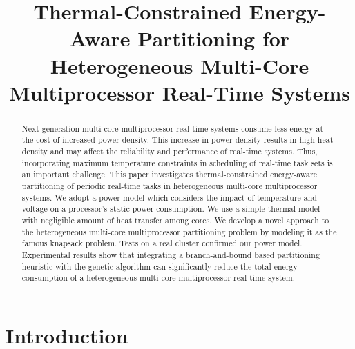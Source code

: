\documentclass[conference]{IEEEtran}
\begin{document}
\title{\LARGE Thermal-Constrained Energy-Aware Partitioning for Heterogeneous Multi-Core Multiprocessor Real-Time Systems}

\author{
 }


\maketitle


\begin{abstract}
Next-generation multi-core multiprocessor real-time systems consume less energy at the cost of increased power-density.
This increase in power-density results in high
heat-density and may affect the reliability and performance of real-time systems. Thus, incorporating maximum temperature
constraints in scheduling of real-time task sets is an important challenge.
This paper investigates thermal-constrained energy-aware %
partitioning of periodic real-time tasks in heterogeneous multi-core
multiprocessor systems. We adopt a power model which considers the impact of temperature and voltage on a processor's static power consumption.
We use a simple thermal model with negligible amount of heat
transfer among cores.
We develop a novel approach to the heterogeneous multi-core multiprocessor partitioning problem by modeling it as the famous knapsack problem.
Tests on a real cluster confirmed our power model.
Experimental results show that integrating a branch-and-bound based partitioning heuristic with the genetic algorithm %
can significantly
reduce the  total energy consumption of a heterogeneous multi-core multiprocessor real-time system.
\end{abstract}


\section{Introduction}
\end{document}
